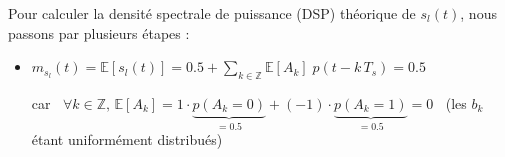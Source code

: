 \documentclass[a4paper, 10pt]{article}
\begin{document}
    \vspace{11pt}
\noindent
    Pour calculer la densité spectrale de puissance (DSP) théorique de $s_l(t)$, nous passons par plusieurs étapes :
    
    \vspace{6pt}
    
    \begin{itemize}
        \item $ m_{s_l}(t) = \mathbb{E}\left[s_l(t)\right] = 0.5 + \displaystyle\sum_{k \in \mathbb{Z}} \mathbb{E}\left[A_k\right]\;p\left(t-k\,T_s\right) = 0.5$
        
        \vspace{6pt}
        car $\;\;\forall k \in \mathbb{Z}, \,\mathbb{E}\left[A_k\right] = 1 \cdot \underbrace{p\left(A_k = 0\right)}_{= \displaystyle0.5} + (-1) \cdot \underbrace{p\left(A_k = 1\right)}_{= \displaystyle0.5} = 0\;\;$ (les $b_k$ étant uniformément distribués)\\
        

\end{itemize}
\end{document}
